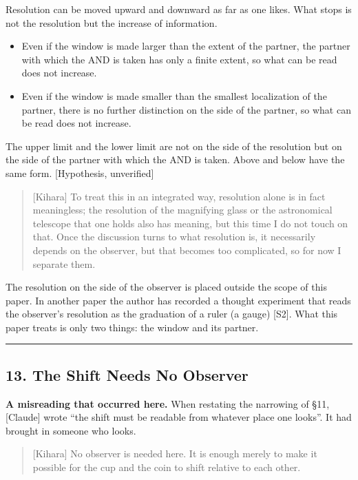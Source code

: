 \documentclass[
  a4paper,
]{article}
\providecommand{\tightlist}{%
  \setlength{\itemsep}{0pt}\setlength{\parskip}{0pt}}
\begin{document}
Resolution can be moved upward and downward as far as one likes. What
stops is not the resolution but the increase of information.

\begin{itemize}
\tightlist
\item
  Even if the window is made larger than the extent of the partner, the
  partner with which the AND is taken has only a finite extent, so what
  can be read does not increase.
\item
  Even if the window is made smaller than the smallest localization of
  the partner, there is no further distinction on the side of the
  partner, so what can be read does not increase.
\end{itemize}

The upper limit and the lower limit are not on the side of the
resolution but on the side of the partner with which the AND is taken.
Above and below have the same form. {[}Hypothesis, unverified{]}

\begin{quote}
{[}Kihara{]} To treat this in an integrated way, resolution alone is in
fact meaningless; the resolution of the magnifying glass or the
astronomical telescope that one holds also has meaning, but this time I
do not touch on that. Once the discussion turns to what resolution is,
it necessarily depends on the observer, but that becomes too
complicated, so for now I separate them.
\end{quote}

The resolution on the side of the observer is placed outside the scope
of this paper. In another paper the author has recorded a thought
experiment that reads the observer's resolution as the graduation of a
ruler (a gauge) {[}S2{]}. What this paper treats is only two things: the
window and its partner.

\begin{center}\rule{0.5\linewidth}{0.5pt}\end{center}

\subsection{13. The Shift Needs No
Observer}\label{the-shift-needs-no-observer}

\textbf{A misreading that occurred here.} When restating the narrowing
of §11, {[}Claude{]} wrote ``the shift must be readable from whatever
place one looks''. It had brought in someone who looks.

\begin{quote}
{[}Kihara{]} No observer is needed here. It is enough merely to make it
possible for the cup and the coin to shift relative to each other.
\end{quote}
\end{document}
